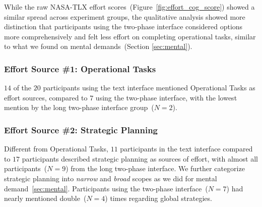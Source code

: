 While the raw NASA-TLX effort scores~(Figure~\ref{fig:effort_cog_score}) showed a similar spread across experiment groups, the qualitative analysis showed more distinction that participants using the two-phase interface considered options more comprehensively and felt less effort on completing operational tasks, similar to what we found on mental demands~(Section \ref{sec:mental}). 


\subsubsection{Effort Source \#1: Operational Tasks} $14$ of the $20$ participants using the text interface mentioned Operational Tasks as effort sources, compared to $7$ using the two-phase interface, with the lowest mention by the long two-phase interface group~($N=2$). 

\subsubsection{Effort Source \#2: Strategic Planning} Different from Operational Tasks, $11$ participants in the text interface compared to $17$ participants described strategic planning as sources of effort, with almost all participants~($N=9$) from the long two-phase interface. We further categorize strategic planning into \textit{narrow} and \textit{broad} scopes as we did for mental demand~\cref{sec:mental}. Participants using the two-phase interface~($N=7$) had nearly mentioned double~($N=4$) times regarding global strategies. 




